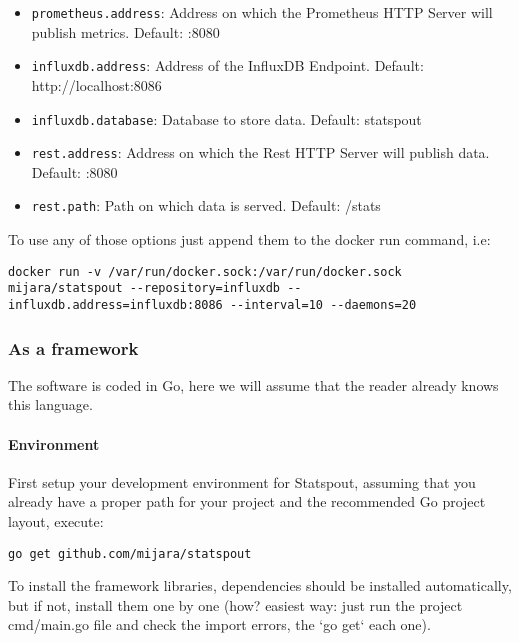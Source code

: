 \begin{itemize}
\begin{itemize}
            \item \texttt{prometheus.address}: Address on which the Prometheus HTTP Server will publish metrics. Default: :8080
            
            \item \texttt{influxdb.address}: Address of the InfluxDB Endpoint. Default: http://localhost:8086
            
            \item \texttt{influxdb.database}: Database to store data. Default: statspout
            
            \item \texttt{rest.address}: Address on which the Rest HTTP Server will publish data. Default: :8080
            
            \item \texttt{rest.path}: Path on which data is served. Default: /stats
        \end{itemize}
\end{itemize}

To use any of those options just append them to the docker run command, i.e:

\begin{lstlisting}
docker run -v /var/run/docker.sock:/var/run/docker.sock mijara/statspout --repository=influxdb --influxdb.address=influxdb:8086 --interval=10 --daemons=20
\end{lstlisting}

\subsubsection{As a framework}

The software is coded in Go, here we will assume that the reader already knows this language.

\paragraph{Environment}

First setup your development environment for Statspout, assuming that you already have a proper path for your project and the recommended Go project layout, execute:

\begin{lstlisting}
go get github.com/mijara/statspout
\end{lstlisting}

To install the framework libraries, dependencies should be installed automatically, but if not, install them one by one (how? easiest way: just run the project cmd/main.go file and check the import errors, the `go get` each one).

